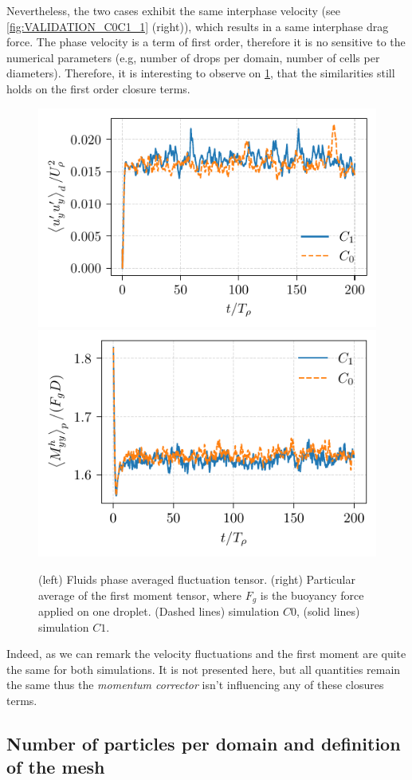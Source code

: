 Nevertheless, the two cases exhibit the same interphase velocity (see \ref{fig:VALIDATION_C0C1_1} (right)), which results in a same interphase drag force. 
The phase velocity is a term of first order, therefore it is no sensitive to the numerical parameters (e.g, number of drops per domain, number of cells per diameters).
Therefore, it is interesting to observe on \ref{fig:VALIDATION_C0C1_2}, that the similarities still holds on the first order closure terms. 
\begin{figure}[h!]
    \centering
    \includegraphics[height= 0.3\textwidth]{image/VALIDATION/C0C1/UpUpf.pdf}
    \includegraphics[height= 0.3\textwidth]{image/VALIDATION/C0C1/PA_Mh.pdf}
    \caption{(left) Fluids phase averaged fluctuation tensor.
            (right) Particular average of the first moment tensor, where $F_g$ is the buoyancy force applied on one droplet.
            (Dashed lines) simulation $C0$,
            (solid lines) simulation $C1$.  }
    \label{fig:VALIDATION_C0C1_2}
\end{figure}
Indeed, as we can remark the velocity fluctuations and the first moment are quite the same for both simulations.
It is not presented here, but all quantities remain the same thus the \textit{momentum corrector} isn't influencing any of these closures terms. 

\subsection{Number of particles per domain and definition of the mesh}

